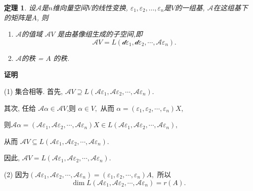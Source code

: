 \documentclass[13pt]{beamer}
\newtheorem{thm}{定理}
\def\pf{{\bf 证明~~ }}
\def\A{\mathscr{A}}
\begin{document}
\begin{frame}
\begin{thm}
设$\A$是$n$维向量空间$V$的线性变换, ${\varepsilon}_{1},{\varepsilon}_{2}, \ldots, {\varepsilon}_{n}$是$V$的一组基, $\A$在这组基下的矩阵是$A$, 则

\begin{enumerate}
	\item  $\A$的值域 $\A V$ 是由基像组生成的子空间,即 $$\mathscr{A} V=L\left(\mathscr{d} {\varepsilon}_{1}, \mathscr{d} {\varepsilon}_{2}, \cdots, \mathscr{A} {\varepsilon}_{n}\right).$$
	\item $\A$的秩 = $A$ 的秩. 
\end{enumerate}
\end{thm}

\pf 
\small{(1) 集合相等. 
首先, $\A V \supseteq L\left(\A \varepsilon_{1}, \A \varepsilon_{2}, \cdots, \A \varepsilon_{n}\right)$.

其次, 任给 $\A \alpha \in \A V$,则 $\alpha \in V,$ 
从而 $\alpha=\left(\varepsilon_{1}, \varepsilon_{2}, \cdots, \varepsilon_{n}\right) X$,

则$\A \alpha=\left(\A \varepsilon_{1}, \A \varepsilon_{2}, \cdots, \A \varepsilon_{n}\right) X \in L\left(\A \varepsilon_{1}, \A \varepsilon_{2}, \cdots, \A \varepsilon_{n}\right),$ 

从而 $\A V \subseteq L\left(\A \varepsilon_{1}, \A \varepsilon_{2}, \cdots, \A \varepsilon_{n}\right).$ 

因此,
$\A V=L\left(\A \varepsilon_{1}, \A \varepsilon_{2}, \cdots, \A \varepsilon_{n}\right)$.


(2)
因为$\left(\A \varepsilon_{1}, \A \varepsilon_{2}, \cdots, \A \varepsilon_{n}\right)=\left(\varepsilon_{1}, \varepsilon_{2}, \cdots, \varepsilon_{n}\right) A,$ 所以$$\operatorname{dim} L \left(\A \varepsilon_{1}, \A \varepsilon_{2}, \cdots, \A \varepsilon_{n}\right)=r(A).$$
}
\end{frame}
\end{document}
